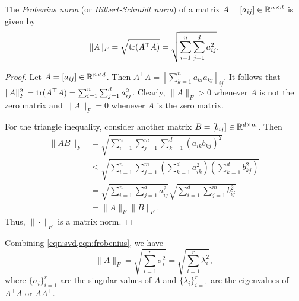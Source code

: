 \begin{theorem}
    \label{def:frobenius}
    \cite{mohri2012foundations,horn2013matrix}
    The \textit{Frobenius norm} (or \textit{Hilbert-Schmidt norm}) of a matrix \(A = [a_{ij}] \in \mathbb{R}^{n \times d}\) is given by
    \begin{equation}
        \label{eqn:frobenius}
        \|A\|_F = \sqrt{\operatorname{tr}(A^\top A)} = \sqrt{\sum_{i=1}^{n} \sum_{j=1}^{d} a_{ij}^2}.
    \end{equation}
\end{theorem}
\begin{proof}
    Let \(A = [a_{ij}] \in \mathbb{R}^{n \times d}\).
    Then \(A^\top A = \left[\sum_{k=1}^{n} a_{k i} a_{k j}\right]_{ij}\).
    It follows that \(\|A\|_F^2 = \operatorname{tr}(A^\top A) = \sum_{i=1}^{n} \sum_{j=1}^{d} a_{ij}^2\).
    Clearly, \(\|A\|_F > 0\) whenever \(A\) is not the zero matrix and \(\|A\|_F = 0\) whenever \(A\) is the zero matrix.

    For the triangle inequality, consider another matrix \(B = [b_{ij}] \in \mathbb{R}^{d \times m}\).
    Then
    \begin{align*}
        \|AB\|_F
        &= \sqrt{\sum_{i=1}^{n} \sum_{j=1}^{m} \sum_{k=1}^{d} (a_{ik} b_{kj})^2}\\
        &\leq \sqrt{\sum_{i=1}^{n} \sum_{j=1}^{m}
        \left(\sum_{k=1}^{d} a_{ik}^2\right) \left(\sum_{k=1}^{d} b_{kj}^2\right)}\\
        &= \sqrt{\sum_{i=1}^{n} \sum_{j=1}^{d} a_{ij}^2}
        \sqrt{\sum_{i=1}^{d} \sum_{j=1}^{m} b_{ij}^2}\\
        &= \|A\|_F \|B\|_F.
    \end{align*}
    Thus, \(\|\cdot\|_F\) is a matrix norm.
\end{proof}

Combining \cref{eqn:svd,eqn:frobenius}, we have
\begin{equation}
    \label{eqn:frobenius-singular-values}
    \|A\|_F = \sqrt{\sum_{i=1}^{r} \sigma_i^2} = \sqrt{\sum_{i=1}^{r} \lambda_i^2},
\end{equation}
where \(\{\sigma_i\}_{i=1}^r\) are the singular values of \(A\) and \(\{\lambda_i\}_{i=1}^r\) are the eigenvalues of \(A^\top A\) or \(AA^\top\).